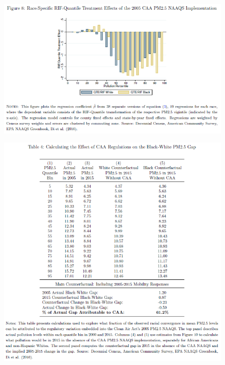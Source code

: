 \documentclass[dvipdfmx,12pt]{beamer}
\begin{document}
\begin{frame}{}
  \begin{figure}
    \centering
    \includegraphics[scale = .65]{F8.png}
  \end{figure}
\end{frame}

\begin{frame}{}
  \begin{figure}
    \centering
    \includegraphics[scale = .5]{T4.png}
  \end{figure}
\end{frame}
\end{document}
